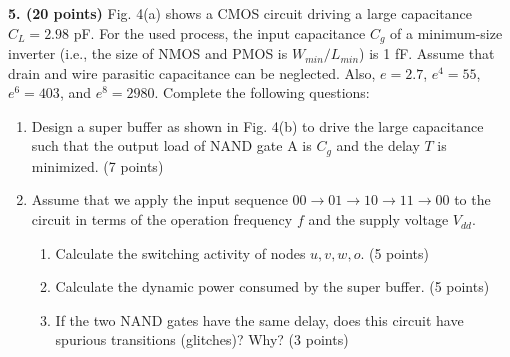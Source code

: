 \documentclass[10pt]{article}
\begin{document}
\textbf{5. (20 points)} Fig. 4(a) shows a CMOS circuit driving a large capacitance $C_L=2.98$ pF. For the used process, the input capacitance $C_g$ of a minimum-size inverter (i.e., the size of NMOS and PMOS is $W_{min}/L_{min}$) is 1 fF. Assume that drain and wire parasitic capacitance can be neglected. Also, $e=2.7$, $e^4=55$, $e^6=403$, and $e^8=2980$. Complete the following questions:
\begin{enumerate}[label=(\alph*),leftmargin=7mm]
\item Design a super buffer as shown in Fig. 4(b) to drive the large capacitance such that the output load of NAND gate A is $C_g$ and the delay $T$ is minimized. (7 points)
\item Assume that we apply the input sequence $00\to01\to10\to11\to00$ to the circuit in terms of the operation frequency $f$ and the supply voltage $V_{dd}$.
\begin{enumerate}[label=\roman*.,leftmargin=6mm]
\item Calculate the switching activity of nodes $u,v,w,o$. (5 points)
\item Calculate the dynamic power consumed by the super buffer. (5 points)
\item If the two NAND gates have the same delay, does this circuit have spurious transitions (glitches)? Why? (3 points)
\end{enumerate}\end{enumerate}
\end{document}

